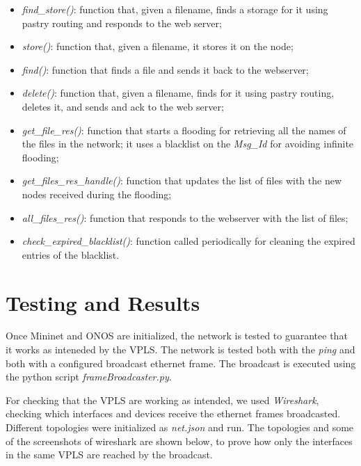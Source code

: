 \documentclass{article}
\begin{document}
\begin{itemize}
    \item \textit{find\_store()}: function that, given a filename, finds a storage for it using pastry routing and responds
    to the web server;
    \item \textit{store()}: function that, given a filename, it stores it on the node;
    \item \textit{find()}: function that finds a file and sends it back to the webserver;
    \item \textit{delete()}: function that, given a filename, finds for it using pastry routing, deletes it,
    and sends and ack to the web server;
    \item \textit{get\_file\_res()}: function that starts a flooding for retrieving all the names of the files
    in the network; it uses a blacklist on the \textit{Msg\_Id} for avoiding infinite flooding; 
    \item \textit{get\_files\_res\_handle()}: function that updates the list of files with the new nodes received during the flooding;
    \item \textit{all\_files\_res()}: function that responds to the webserver with the list of files;
    \item \textit{check\_expired\_blacklist()}: function called periodically for cleaning the expired entries of the blacklist.
\end{itemize}

\section{Testing and Results}

Once Mininet and ONOS are initialized, the network is tested to guarantee 
that it works as inteneded by the VPLS. The network is tested both with the 
\textit{ping} and both with a configured broadcast ethernet frame. The 
broadcast is executed using the python script \textit{frameBroadcaster.py}.

For checking that the VPLS are working as intended, we used \textit{Wireshark},
 checking which interfaces and devices receive the ethernet frames broadcasted.
Different topologies were initialized as \textit{net.json} and run. 
The topologies and some of the screenshots of wireshark are shown below, 
to prove how only the interfaces in the same VPLS are reached by the broadcast.
\end{document}
